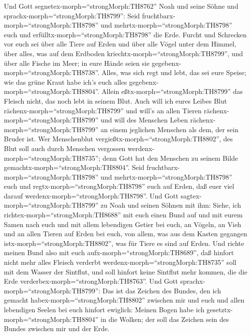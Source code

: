  Und Gott segnetex-morph=``strongMorph:TH8762'' Noah und
seine Söhne und sprachx-morph=``strongMorph:TH8799'': Seid
fruchtbarx-morph=``strongMorph:TH8798'' und
mehrtx-morph=``strongMorph:TH8798'' euch und
erfülltx-morph=``strongMorph:TH8798'' die Erde.  Furcht und
Schrecken vor euch sei über alle Tiere auf Erden und über alle Vögel
unter dem Himmel, über alles, was auf dem Erdboden
kriechtx-morph=``strongMorph:TH8799'', und über alle Fische im Meer; in
eure Hände seien sie gegebenx-morph=``strongMorph:TH8738''. 
Alles, was sich regt und lebt, das sei eure Speise; wie das grüne Kraut
habe ich's euch alles gegebenx-morph=``strongMorph:TH8804''.
 Allein eßtx-morph=``strongMorph:TH8799'' das Fleisch nicht,
das noch lebt in seinem Blut.  Auch will ich eures Leibes
Blut rächenx-morph=``strongMorph:TH8799'' und will's an allen Tieren
rächenx-morph=``strongMorph:TH8799'' und will des Menschen Leben
rächenx-morph=``strongMorph:TH8799'' an einem jeglichen Menschen als
dem, der sein Bruder ist.  Wer Menschenblut
vergießtx-morph=``strongMorph:TH8802'', des Blut soll auch durch
Menschen vergossen werdenx-morph=``strongMorph:TH8735''; denn Gott hat
den Menschen zu seinem Bilde gemachtx-morph=``strongMorph:TH8804''.
 Seid fruchtbarx-morph=``strongMorph:TH8798'' und
mehrtx-morph=``strongMorph:TH8798'' euch und
regtx-morph=``strongMorph:TH8798'' euch auf Erden, daß euer viel darauf
werdenx-morph=``strongMorph:TH8798''.  Und Gott
sagtex-morph=``strongMorph:TH8799'' zu Noah und seinen Söhnen mit ihm:
 Siehe, ich richtex-morph=``strongMorph:TH8688'' mit euch
einen Bund auf und mit eurem Samen nach euch  und mit allem
lebendigen Getier bei euch, an Vögeln, an Vieh und an allen Tieren auf
Erden bei euch, von allem, was aus dem Kasten gegangen
istx-morph=``strongMorph:TH8802'', was für Tiere es sind auf Erden.
 Und richte meinen Bund also mit euch
aufx-morph=``strongMorph:TH8689'', daß hinfort nicht mehr alles Fleisch
verderbt werdenx-morph=``strongMorph:TH8735'' soll mit dem Wasser der
Sintflut, und soll hinfort keine Sintflut mehr kommen, die die Erde
verderbex-morph=``strongMorph:TH8763''.  Und Gott
sprachx-morph=``strongMorph:TH8799'': Das ist das Zeichen des Bundes,
den ich gemacht habex-morph=``strongMorph:TH8802'' zwischen mir und euch
und allen lebendigen Seelen bei euch hinfort ewiglich: 
Meinen Bogen habe ich gesetztx-morph=``strongMorph:TH8804'' in die
Wolken; der soll das Zeichen sein des Bundes zwischen mir und der Erde.

